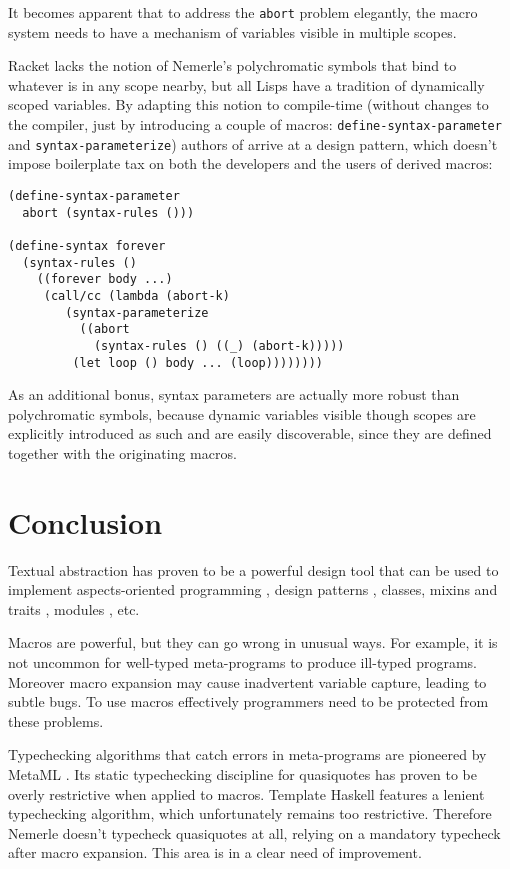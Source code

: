\documentclass[10pt,journal,a4paper]{IEEEtran}
\begin{document}
It becomes apparent that to address the \small \texttt{abort} \normalsize problem elegantly,
the macro system needs to have a mechanism of variables visible in multiple scopes.

Racket lacks the notion
of Nemerle's polychromatic symbols that bind to whatever is in any scope nearby, but all Lisps
have a tradition of dynamically scoped variables. By adapting this notion to compile-time
(without changes to the compiler, just by introducing a couple of macros:
\small \texttt{define-syntax-parameter} \normalsize and \small \texttt{syntax-parameterize}\normalsize)
authors of \cite{barzilay11} arrive at a design pattern, which doesn't impose boilerplate tax
on both the developers and the users of derived macros:

\small
\begin{verbatim}
(define-syntax-parameter
  abort (syntax-rules ()))

(define-syntax forever
  (syntax-rules ()
    ((forever body ...)
     (call/cc (lambda (abort-k)
        (syntax-parameterize
          ((abort
            (syntax-rules () ((_) (abort-k)))))
         (let loop () body ... (loop))))))))
\end{verbatim}
\normalsize

As an additional bonus, syntax parameters are actually more robust than polychromatic symbols,
because dynamic variables visible though scopes are explicitly introduced as such
and are easily discoverable, since they are defined together with the originating macros.

\section{Conclusion}

Textual abstraction has proven to be a powerful design tool that can be used to implement
aspects-oriented programming \cite{skalski04}, design patterns \cite{skalski05},
classes, mixins and traits \cite{flatt06}, modules \cite{flatt10}, etc.

Macros are powerful, but they can go wrong in unusual ways.
For example, it is not uncommon for well-typed meta-programs to produce ill-typed programs.
Moreover macro expansion may cause inadvertent variable capture, leading to
subtle bugs. To use macros effectively programmers need to be protected from these problems.

Typechecking algorithms that catch errors in meta-programs are pioneered by MetaML \cite{taha99}.
Its static typechecking discipline for quasiquotes has proven to be overly restrictive when applied to
macros. Template Haskell features a lenient typechecking algorithm, which unfortunately remains too
restrictive. Therefore Nemerle doesn't typecheck quasiquotes at all, relying on a mandatory typecheck
after macro expansion. This area is in a clear need of improvement.
\end{document}
